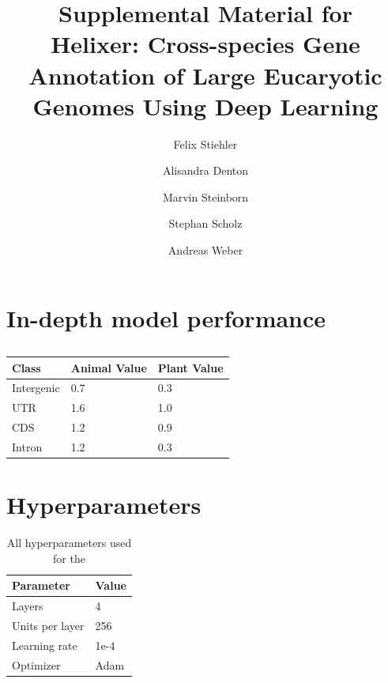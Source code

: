 \documentclass{article}
\begin{document}
\title{Supplemental Material for \\ Helixer: Cross-species Gene Annotation of Large Eucaryotic Genomes Using Deep Learning}

\author[1]{Felix Stiehler}
\author[1]{Alisandra Denton}
\author[1]{Marvin Steinborn}
\author[ \hspace{-1ex}]{Stephan Scholz}
\author[1]{Andreas Weber}


\date{}
\maketitle
\tableofcontents

\newpage
\section{In-depth model performance}

\begin{table}[!h]
\renewcommand\thetable{S1}
\centering
\begin{tabular}{@{}lll@{}}
\hline
Class & Animal Value & Plant Value \\ [0.5ex]
\hline
Intergenic & 0.7 & 0.3 \\
UTR & 1.6 & 1.0 \\
CDS & 1.2 & 0.9 \\
Intron & 1.2 & 0.3 \\
\hline
\end{tabular}
\caption{}
\end{table}

\newpage
\section{Hyperparameters}

\begin{table}[!h]
\renewcommand\thetable{S1}
\centering
\begin{tabular}{@{}ll@{}}
\hline
Parameter & Value \\ [0.5ex]
\hline
Layers & 4\\
Units per layer & 256\\
Learning rate & 1e-4\\
Optimizer & Adam\\
\hline
\end{tabular}
\caption{All hyperparameters used for the }
\label{suptab:params}
\end{table}
\end{document}
